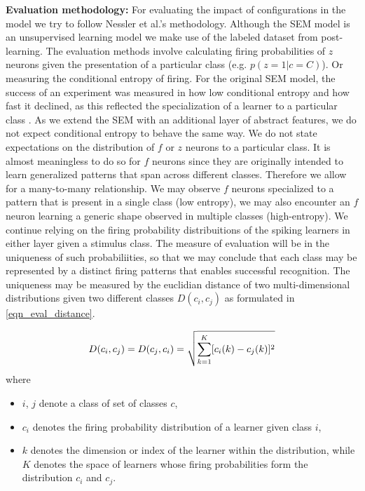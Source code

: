 \documentclass{report}
\begin{document}
\textbf{Evaluation methodology:} For evaluating the impact of configurations in the model we try to follow Nessler et al.'s methodology. Although the SEM model is an unsupervised learning model we make use of the labeled dataset from \cite{LeCun1998} post-learning. The evaluation methods involve calculating firing probabilities of $z$ neurons given the presentation of a particular class (e.g. $p(z=1|c=C)$). Or measuring the conditional entropy of firing. For the original SEM model, the success of an experiment was measured in how low conditional entropy and how fast it declined, as this reflected the specialization of a learner to a particular class \cite{Nessler2010}. As we extend the SEM with an additional layer of abstract features, we do not expect conditional entropy to behave the same way. We do not state expectations on the distribution of $f$ or $z$ neurons to a particular class. It is almost meaningless to do so for $f$ neurons since they are originally intended to learn generalized patterns that span across different classes. Therefore we allow for a many-to-many relationship. We may observe $f$ neurons specialized to a pattern that is present in a single class (low entropy), we may also encounter an $f$ neuron learning a generic shape observed in multiple classes (high-entropy). We continue relying on the firing probability distribuitions of the spiking learners in either layer given a stimulus class. The measure of evaluation will be in the uniqueness of such probabiliities, so that we may conclude that each class may be represented by a distinct firing patterns that enables successful recognition. The uniqueness may be measured by the euclidian distance of two multi-dimensional distributions given two different classes $D(c_i, c_j)$ as formulated in \ref{eqn_eval_distance}.

\begin{equation}
		D(c_i, c_j) = D(c_j, c_i) = \sqrt{\sum_{k=1}^{K} [c_i(k)-c_j(k)]^2} \\
	\label{eqn_eval_distance}
\end{equation}
where
\begin{itemize}
	\item $i$, $j$ denote a class of set of classes $c$,
  \item $c_i$ denotes the firing probability distribution of a learner given class $i$,
  \item $k$ denotes the dimension or index of the learner within the distribution, while $K$ denotes the space of learners whose firing probabilities form the distribution $c_i$ and $c_j$.
\end{itemize}
\end{document}
